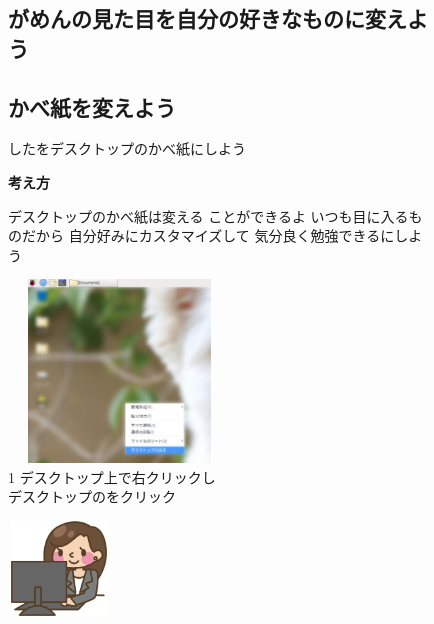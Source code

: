 \documentclass[a4paper,12pt]{jarticle}
\begin{document}
\begin{figure}
  \subsection{がめんの見た目を自分の好きなものに変えよう}
  \subsection{\theExercise かべ紙を変えよう}
  したをデスクトップのかべ紙にしよう

  \textbf{考え方}


  \bigskip



  \centering
  \begin{minipage}{\textwidth}
    \begin{minipage}{7.737cm}
      デスクトップのかべ紙は変える
      ことができるよ
      いつも目に入るものだから
      自分好みにカスタマイズして
      気分良く勉強できるにしよう
      \begin{minipage}{7.739cm}
        \includegraphics[width=5.892cm,height=4.864cm]{textbook-img107.png}\\
        1 デスクトップ上で右クリックし\\
        デスクトップのをクリック
      \end{minipage}
    \end{minipage}
    \begin{minipage}{2.582cm}
    \end{minipage}
    \begin{minipage}{7.737cm}
      \includegraphics[width=2.712cm,height=2.509cm]{textbook-img082.png}

\end{minipage}
\end{minipage}
\end{figure}
\end{document}
